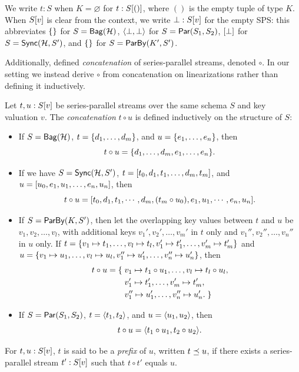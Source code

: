 We write $t: S$ when $K = \varnothing$ for $t: \spstype{()}{S}$, where $()$ is the empty tuple of type $K$.
When $\spstype{v}{S}$ is clear from the context,
we write $\spsemp: \spstype{v}{S}$ for the empty SPS:
this abbreviates $\spsbag{}$ for $S = \relleaf{\mathcal{H}}$,
$\spspar{\spsemp}{\spsemp}$ for $S = \parcomp{S_1}{S_2}$,
$\spsseq{\bot}$ for $S = \hier{\mathcal{H}}{S'}$,
and $\spsbag{}$ for $S = \keyby{K'}{S'}$.

Additionally,  defined \emph{concatenation} of series-parallel streams, denoted $\circ$.
In our setting we instead derive $\circ$ from concatenation on linearizations rather than defining it inductively.

\begin{definition}
\label{45:def:trace-concat}
Let $t, u: \spstype{v}{S}$ be series-parallel streams over the same schema $S$ and key valuation $v$.
The  \emph{concatenation} $t \circ u$ is defined inductively on the structure of $S$:
\begin{itemize}
\item If $S = \relleaf{\mathcal{H}}$,
$t = \spsbag{d_1, \ldots, d_m}$,
and $u = \spsbag{e_1, \ldots, e_n}$,
then
\[t \circ u = \spsbag{d_1, \ldots, d_m, e_1, \ldots, e_n}.\]
\item If we have $S = \hier{\mathcal{H}}{S'}$,
$t = \spsseq{t_0, d_1, t_1, \ldots, d_m, t_m}$,
and
$u = \spsseq{u_0, e_1, u_1, \ldots, e_n, u_n}$,
then
\[t \circ u =
\spsseq{t_0, d_1, t_1, \cdots, d_m, (t_m \circ u_0), e_1, u_1, \cdots, e_n, u_n}.
\]
\item If $S = \keyby{K}{S'}$,
then let the overlapping key values between $t$ and $u$ be
$v_1, v_2, \ldots, v_l$,
with additional keys $v_1', v_2', \ldots, v_m'$ in $t$ only
and $v_1'', v_2'', \ldots, v_n''$ in $u$ only.
If
$t = \spsbag{\keyed{v_1}{t_1}, \ldots, \keyed{v_l}{t_l},
\keyed{v_1'}{t_1'}, \ldots, \keyed{v_m'}{t_m'}}$
and
$u = \spsbag{\keyed{v_1}{u_1}, \ldots, \keyed{v_l}{u_l},
\keyed{v_1''}{u_1'}, \ldots, \keyed{v_n''}{u_n'}}$,
then
\begin{align*}
t \circ u = \spsbagleft{}
&\keyed{v_1}{t_1 \circ u_1}, \ldots, \keyed{v_l}{t_l \circ u_l}, \\
&\keyed{v_1'}{t_1'}, \ldots, \keyed{v_m'}{t_m'}, \\
&\keyed{v_1''}{u_1'}, \ldots, \keyed{v_n''}{u_n'}.\spsbagright{}
\end{align*}
\item If $S = \parcomp{S_1}{S_2}$,
$t = \spspar{t_1}{t_2}$, and $u = \spspar{u_1}{u_2}$,
then
\[
t \circ u = \spspar{t_1 \circ u_1}{t_2 \circ u_2}.
\]
\end{itemize}
For $t, u: \spstype{v}{S}$, $t$ is said to be a {\em prefix} of $u$, written $t\prefix u$,
if there exists a series-parallel stream $t' : \spstype{v}{S}$ such that $t\circ t'$
equals $u$.
\end{definition}

